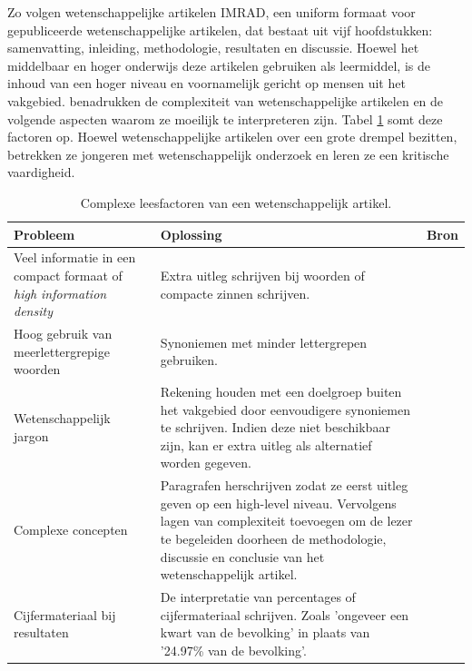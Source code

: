 \medspace

Zo volgen wetenschappelijke artikelen IMRAD, een uniform formaat voor gepubliceerde wetenschappelijke artikelen, dat bestaat uit vijf hoofdstukken: samenvatting, inleiding, methodologie, resultaten en discussie. Hoewel het middelbaar en hoger onderwijs deze artikelen gebruiken als leermiddel, is  de inhoud van een hoger niveau en voornamelijk gericht op mensen uit het vakgebied. \textcite{Pain2016, CAS2021} benadrukken de complexiteit van wetenschappelijke artikelen en de volgende aspecten waarom ze moeilijk te interpreteren zijn. Tabel \ref{table:scientific-paper-struggles} somt deze factoren op. Hoewel wetenschappelijke artikelen over een grote drempel bezitten, betrekken ze jongeren met wetenschappelijk onderzoek en leren ze een kritische vaardigheid. 

\medspace

\begin{center}
	\begin{table}[H]
	\begin{tabular}{| m{4cm} | m{8cm} | m{3cm} | }
		\hline
		\textbf{Probleem} & \textbf{Oplossing} & Bron \\
		\hline
		Veel informatie in een compact formaat of \textit{high information density} & Extra uitleg schrijven bij woorden of compacte zinnen schrijven. & \autocite{Matarese2013, PlavenSigray2017} \\
		\hline
		Hoog gebruik van meerlettergrepige woorden & Synoniemen met minder lettergrepen gebruiken. & \autocite{Siddharthan2006} \\
		\hline
		Wetenschappelijk jargon & Rekening houden met een doelgroep buiten het vakgebied door eenvoudigere synoniemen te schrijven. Indien deze niet beschikbaar zijn, kan er extra uitleg als alternatief worden gegeven. & \autocite{PlavenSigray2017} \\
		\hline
		Complexe concepten & Paragrafen herschrijven zodat ze eerst uitleg geven op een high-level niveau. Vervolgens lagen van complexiteit toevoegen om de lezer te begeleiden doorheen de methodologie, discussie en conclusie van het wetenschappelijk artikel. & \autocite{Pain2016} \\ 
		\hline
		Cijfermateriaal bij resultaten & De interpretatie van percentages of cijfermateriaal schrijven. Zoals 'ongeveer een kwart van de bevolking' in plaats van '24.97\% van de bevolking'. & \autocite{PlavenSigray2017} \\
		\hline
	\end{tabular}
	\caption{Complexe leesfactoren van een wetenschappelijk artikel.}
	\label{table:scientific-paper-struggles}
	\end{table}
\end{center}

